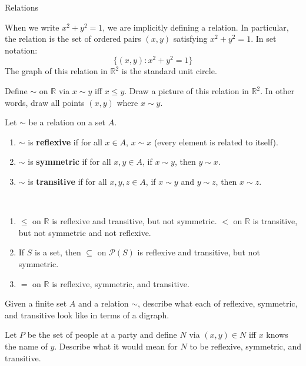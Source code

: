 \begin{section}{Relations}
\begin{example}
When we write $x^2+y^2=1$, we are implicitly defining a relation.  In particular, the relation is the set of ordered pairs $(x,y)$ satisfying $x^2+y^2=1$.  In set notation:
\[
\{(x,y):x^2+y^2=1\}
\]
The graph of this relation in $\mathbb{R}^2$ is the standard unit circle.
\end{example}

\begin{exercise}
Define $\sim$ on $\mathbb{R}$ via $x\sim y$ iff $x\leq y$.  Draw a picture of this relation in $\mathbb{R}^2$. In other words, draw all points $(x,y)$ where $x\sim y$.
\end{exercise}

\begin{definition}
Let $\sim$ be a relation on a set $A$.
\begin{enumerate}
\item $\sim$ is \textbf{reflexive} if for all $x\in A$, $x\sim x$ (every element is related to itself).
\item $\sim$ is \textbf{symmetric} if for all $x,y\in A$, if $x\sim y$, then $y\sim x$.
\item $\sim$ is \textbf{transitive} if for all $x,y,z\in A$, if $x\sim y$ and $y\sim z$, then $x\sim z$.
\end{enumerate}
\end{definition}

\begin{example}\
\begin{enumerate}
\item $\leq$ on $\mathbb{R}$ is reflexive and transitive, but not symmetric.
$<$ on $\mathbb{R}$ is transitive, but not symmetric and not reflexive.
\item If $S$ is a set, then $\subseteq$ on $\mathcal{P}(S)$ is reflexive and transitive, but not symmetric.
\item $=$ on $\mathbb{R}$ is reflexive, symmetric, and transitive.
\end{enumerate}

\end{example}

\begin{exercise}
Given a finite set $A$ and a relation $\sim$, describe what each of reflexive, symmetric, and transitive look like in terms of a digraph.
\end{exercise}

\begin{exercise}
Let $P$ be the set of people at a party and define $N$ via $(x,y)\in N$ iff $x$ knows the name of $y$.  Describe what it would mean for $N$ to be reflexive, symmetric, and transitive.
\end{exercise}


\end{section}
